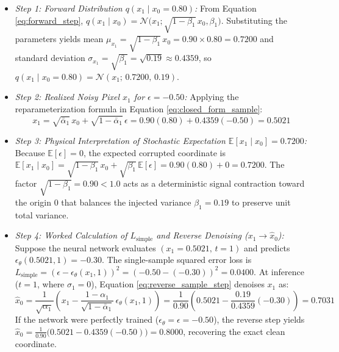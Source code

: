 \documentclass[10pt,a4paper]{article}
\begin{document}
\begin{itemize}[leftmargin=1.5em, itemsep=0.3em]
    \item \textit{Step 1: Forward Distribution $q(x_1 \mid x_0 = 0.80)$:}
    From Equation \eqref{eq:forward_step}, $q(x_1 \mid x_0) = \mathcal{N}\big(x_1; \sqrt{1 - \beta_1}\,x_0, \beta_1\big)$. Substituting the parameters yields mean $\mu_{x_1} = \sqrt{1 - \beta_1}\,x_0 = 0.90 \times 0.80 = 0.7200$ and standard deviation $\sigma_{x_1} = \sqrt{\beta_1} = \sqrt{0.19} \approx 0.4359$, so $q(x_1 \mid x_0 = 0.80) = \mathcal{N}(x_1; \, 0.7200, \, 0.19)$.

    \item \textit{Step 2: Realized Noisy Pixel $x_1$ for $\epsilon = -0.50$:}
    Applying the reparameterization formula in Equation \eqref{eq:closed_form_sample}:
    \begin{equation}
        x_1 = \sqrt{\bar{\alpha}_1}\,x_0 + \sqrt{1 - \bar{\alpha}_1}\,\epsilon = 0.90(0.80) + 0.4359(-0.50) = 0.5021
    \end{equation}

    \item \textit{Step 3: Physical Interpretation of Stochastic Expectation $\mathbb{E}[x_1 \mid x_0] = 0.7200$:}
    Because $\mathbb{E}[\epsilon] = 0$, the expected corrupted coordinate is $\mathbb{E}[x_1 \mid x_0] = \sqrt{1 - \beta_1}\,x_0 + \sqrt{\beta_1}\,\mathbb{E}[\epsilon] = 0.90(0.80) + 0 = 0.7200$. The factor $\sqrt{1 - \beta_1} = 0.90 < 1.0$ acts as a deterministic signal contraction toward the origin $0$ that balances the injected variance $\beta_1 = 0.19$ to preserve unit total variance.

    \item \textit{Step 4: Worked Calculation of $L_{\text{simple}}$ and Reverse Denoising ($x_1 \to \hat{x}_0$):}
    Suppose the neural network evaluates $(x_1 = 0.5021, \, t = 1)$ and predicts $\epsilon_\theta(0.5021, 1) = -0.30$. The single-sample squared error loss is $L_{\text{simple}} = (\epsilon - \epsilon_\theta(x_1, 1))^2 = (-0.50 - (-0.30))^2 = 0.0400$. At inference ($t=1$, where $\sigma_1 = 0$), Equation \eqref{eq:reverse_sample_step} denoises $x_1$ as:
    \begin{equation}
        \hat{x}_0 = \frac{1}{\sqrt{\alpha_1}}\left(x_1 - \frac{1 - \alpha_1}{\sqrt{1 - \bar{\alpha}_1}}\,\epsilon_\theta(x_1, 1)\right) = \frac{1}{0.90}\left(0.5021 - \frac{0.19}{0.4359}(-0.30)\right) = 0.7031
    \end{equation}
    If the network were perfectly trained ($\epsilon_\theta = \epsilon = -0.50$), the reverse step yields $\hat{x}_0 = \frac{1}{0.90}\big(0.5021 - 0.4359(-0.50)\big) = 0.8000$, recovering the exact clean coordinate.
\end{itemize}
\end{document}
